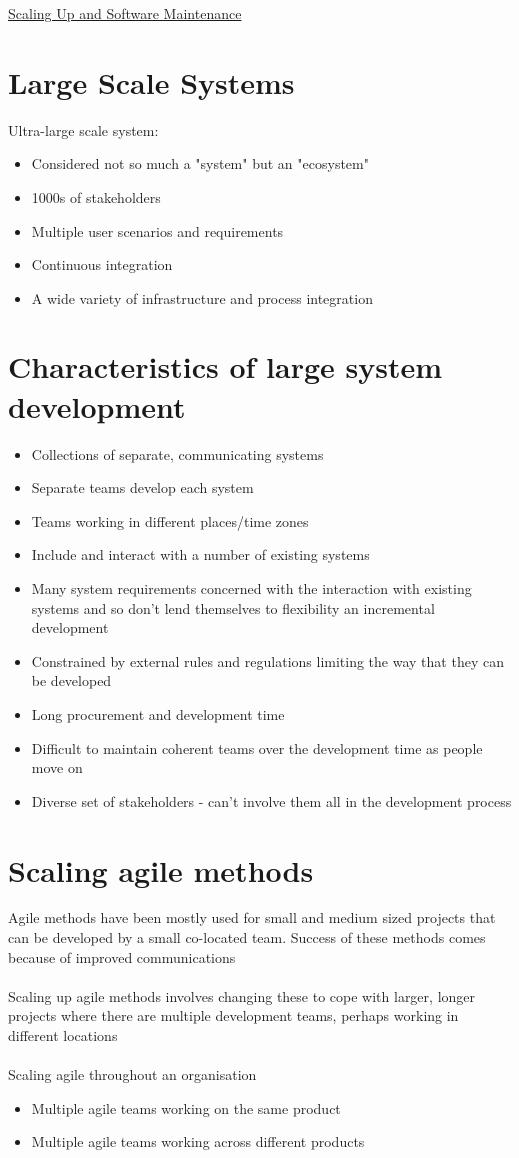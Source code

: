 \documentclass{article}[18pt]
\begin{document}
\begin{center}
\underline{\huge Scaling Up and Software Maintenance}
\end{center}
\section{Large Scale Systems}
Ultra-large scale system:
\begin{itemize}
	\item Considered not so much a "system" but an "ecosystem"
	\item 1000s of stakeholders
	\item Multiple user scenarios and requirements
	\item Continuous integration
	\item A wide variety of infrastructure and process integration
\end{itemize}
\section{Characteristics of large system development}
\begin{itemize}
	\item Collections of separate, communicating systems
	\item Separate teams develop each system
	\item Teams working in different places/time zones
	\item Include and interact with a number of existing systems
	\item Many system requirements concerned with the interaction with existing systems and so don't lend themselves to flexibility an incremental development
	\item Constrained by external rules and regulations limiting the way that they can be developed
	\item Long procurement and development time
	\item Difficult to maintain coherent teams over the development time as people move on
	\item Diverse set of stakeholders - can't involve them all in the development process
\end{itemize}
\section{Scaling agile methods}
Agile methods have been mostly used for small and medium sized projects that can be developed by a small co-located team. Success of these methods comes because of improved communications\\
\\
Scaling up agile methods involves changing these to cope with larger, longer projects where there are multiple development teams, perhaps working in different locations\\
\\
Scaling agile throughout an organisation
\begin{itemize}
	\item Multiple agile teams working on the same product
	\item Multiple agile teams working across different products
\end{itemize}
\end{document}

